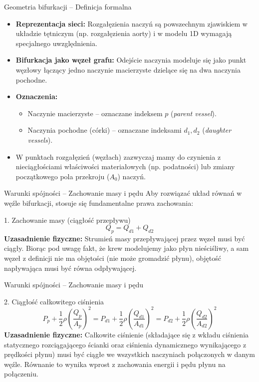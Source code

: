 \documentclass[aspectratio=169]{beamer}
\begin{document}
\begin{frame}{Geometria bifurkacji – Definicja formalna}
    \begin{itemize}
        \item \textbf{Reprezentacja sieci:} Rozgałęzienia naczyń są powszechnym zjawiskiem w układzie tętniczym (np. rozgałęzienia aorty) i w modelu 1D wymagają specjalnego uwzględnienia.
        \item \textbf{Bifurkacja jako węzeł grafu:} Odejście naczynia modeluje się jako punkt węzłowy łączący jedno naczynie macierzyste dzielące się na dwa naczynia pochodne.
        \item \textbf{Oznaczenia:}
        \begin{itemize}
            \item Naczynie macierzyste – oznaczane indeksem \textbf{$p$} (\textit{parent vessel}).
            \item Naczynia pochodne (córki) – oznaczane indeksami \textbf{$d_1, d_2$} (\textit{daughter vessels}).
        \end{itemize}
        \item W punktach rozgałęzień (węzłach) zazwyczaj mamy do czynienia z nieciągłościami właściwości materiałowych (np. podatności) lub zmiany początkowego pola przekroju ($A_0$) naczyń.
    \end{itemize}
\end{frame}

\begin{frame}{Warunki spójności – Zachowanie masy i pędu}
    Aby rozwiązać układ równań w węźle bifurkacji, stosuje się fundamentalne prawa zachowania:

    \vspace{0.3cm}
    \begin{block}{1. Zachowanie masy (ciągłość przepływu)}
        \[ Q_p = Q_{d1} + Q_{d2} \]
        \textbf{Uzasadnienie fizyczne:} Strumień masy przepływającej przez węzeł musi być ciągły. Biorąc pod uwagę fakt, że krew modelujemy jako płyn nieściśliwy, a sam węzeł z definicji nie ma objętości (nie może gromadzić płynu), objętość napływająca musi być równa odpływającej.
    \end{block}
\end{frame}

\begin{frame}{Warunki spójności – Zachowanie masy i pędu}
    \begin{block}{2. Ciągłość całkowitego ciśnienia}
        \[ P_p + \frac{1}{2}\rho \left(\frac{Q_p}{A_p}\right)^2 = P_{d1} + \frac{1}{2}\rho \left(\frac{Q_{d1}}{A_{d1}}\right)^2 = P_{d2} + \frac{1}{2}\rho \left(\frac{Q_{d2}}{A_{d2}}\right)^2 \]
        \textbf{Uzasadnienie fizyczne:} Całkowite ciśnienie (składające się z wkładu ciśnienia statycznego rozciągającego ścianki oraz ciśnienia dynamicznego wynikającego z prędkości płynu) musi być ciągłe we wszystkich naczyniach połączonych w danym węźle. Równanie to wynika wprost z zachowania energii i pędu płynu na połączeniu.
    \end{block}
\end{frame}
\end{document}
